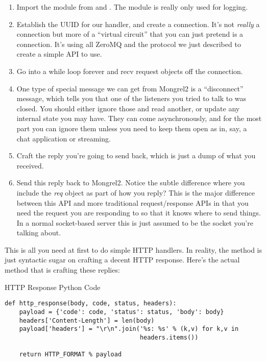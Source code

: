 \begin{enumerate}
\item Import the  module from  and .  The  module is
    really only used for logging.
\item Establish the UUID for our handler, and create a connection.  It's not \emph{really} a connection
    but more of a ``virtual circuit'' that you can just pretend is a connection.  It's using all ZeroMQ and
    the protocol we just described to create a simple API to use.
\item Go into a while loop forever and recv request objects off the connection.
\item One type of special message we can get from Mongrel2 is a ``disconnect'' message, which tells you that
    one of the listeners you tried to talk to was closed.  You should either ignore those and read
    another, or update any internal state you may have.  They can come asynchronously, and for the most
    part you can ignore them unless you need to keep them open as in, say, a chat application or streaming.
\item Craft the reply you're going to send back, which is just a dump of what you received.
\item Send this reply back to Mongrel2.  Notice the subtle difference where you include the \emph{req} object
    as part of how you reply?  This is the major difference between this API and more traditional
    request/response APIs in that you need the request you are responding to so that it knows where to send
    things.  In a normal socket-based server this is just assumed to be the socket you're talking about.
\end{enumerate}

This is all you need at first to do simple HTTP handlers.  In reality, the  method is
just syntactic sugar on crafting a decent HTTP response.  Here's the actual method that is crafting these replies:

\begin{code}{HTTP Response Python Code}
\begin{lstlisting}
def http_response(body, code, status, headers):
    payload = {'code': code, 'status': status, 'body': body}
    headers['Content-Length'] = len(body)
    payload['headers'] = "\r\n".join('%s: %s' % (k,v) for k,v in
                                     headers.items())

    return HTTP_FORMAT % payload

\end{lstlisting}
\end{code}

